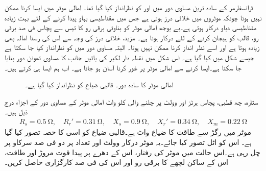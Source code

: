 ٹرانسفارمر کے سادہ ترین مساوی دور میں  اور  کو نظرانداز کیا گیا تھا۔ امالی موٹر میں ایسا کرنا ممکن نہیں ہوتا چونکہ موٹروں میں خلائی درز ہوتی ہے جس میں مقناطیسی بہاو پیدا کرنے کے لئے بہت زیادہ مقناطیسی دباو درکار ہوتی ہے۔بے بوجھ امالی موٹر کو بناوٹی برقی رو کا تیس سے پچاس فی صد برقی رو، قالب کو ہیجان کرنے کے لئے درکار ہوتا ہے۔ مزید، خلائی درز کی وجہ سے اس کی رستا امالہ بھی زیادہ ہوتا ہے اور اسے نظر انداز کرنا ممکن نہیں ہوتا۔ البتہ مساوی دور میں  کو نظرانداز کیا جا سکتا ہے جیسے شکل  میں کیا گیا ہے۔ اس شکل میں نقطہ دار لکیر کی بائیں جانب کا مساوی تھونن دور بنایا جا سکتا ہے۔ایسا کرنے سے امالی موٹر پر غور کرنا  آسان ہو جاتا ہے۔ اب ہم ایسا ہی کرتے ہیں۔
\begin{figure}
\centering
\caption{امالی موٹر کا سادہ دور۔ قالبی ضیاع کو نظرانداز کیا گیا ہے۔}
\label{شکل_امالی_ساکن_حصے_کا_تھونن_دور}
\end{figure}
%
ستارہ، چھ قطبی، پچاس ہرٹز اور   وولٹ پر چلنے والی   کلو واٹ امالی موٹر کے مساوی دور کے اجزاء درج ذیل ہیں۔
\begin{align*}
R_s= \SI{0.5}{\ohm}, \quad R_r'=\SI{0.31}{\ohm}, \quad X_s=\SI{0.9}{\ohm}, \quad X_r'=\SI{0.34}{\ohm}, \quad X_m=\SI{0.22}{\ohm} 
\end{align*}
موٹر میں رگڑ سے طاقت کا ضیاع   واٹ ہے۔قالبی ضیاع کو اسی کا حصہ تصور کیا گیا ہے۔ اس کو اٹل تصور کیا جائے۔یہ موٹر درکار وولٹ اور تعداد  پر دو فی صد سرکاو پر چل رہی ہے۔اس حالت میں موٹر کی رفتار، اس کے دھرے پر پیدا قوت مروڑ اور طاقت، اس کے ساکن لچھے کا برقی رو اور اس کی فی صد کارگزاری حاصل کریں۔

